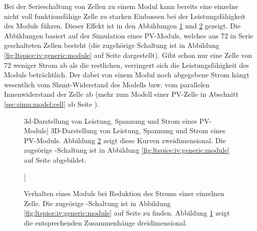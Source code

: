 Bei  der  Serieschaltung   von  Zellen  zu  einem  Modul   kann  bereits  eine
einzelne   nicht   voll   funktionsf\"ahige   Zelle   zu   starken   Einbussen
bei   der   Leistungsf\"ahigkeit  des   Moduls   f\"uhren\footnotemark. Dieser
Effekt  ist  in   den  Abbildungen  \ref{fig:simu:iv-curves:module:generic:3d}
und    \ref{fig:simu:iv-curves:module:generic}     gezeigt. Die    Abbildungen
basiert    auf   der    Simulation   eines    PV-Moduls,   welches    aus   72
in   Serie   geschalteten   Zellen   besteht   (die   zugeh\"orige   Schaltung
ist    in    Abbildung     \ref{fig:ltspice:iv:generic:module}    auf    Seite
\pageref{fig:ltspice:iv:generic:module}  dargestellt). Gibt   schon  nur  eine
Zelle  von  72 weniger  Strom  ab  als  die  restlichen, verringert  sich  die
Leistungsf\"ahigkeit des Moduls betr\"achtlich. Der dabei von einem Modul noch
abgegebene Strom h\"angt wesentlich vom  Shunt-Widerstand des Modells bzw. vom
parallelen Innenwiderstand  der Zelle  ab (mehr zum  Modell einer  PV-Zelle in
Abschnitt \ref{sec:simu:model:cell} ab Seite \pageref{sec:simu:model:cell}).


\begin{figure}[h!tb]
    \centering
    
    \caption
    [3d-Darstellung von Leistung, Spannung und Strom eines PV-Moduls]
    {%
        3D-Darstellung  von  Leistung,  Spannung und  Strom  eines  PV-Moduls.
        Abbildung    \ref{fig:simu:iv-curves:module:generic}    zeigt    diese
        Kurven  zweidimensional.    Die  zuge\"orige  -Schaltung
        ist   in  Abbildung   \ref{fig:ltspice:iv:generic:module}  auf   Seite
        \pageref{fig:ltspice:iv:generic:module} abgebildet.%
    }
    \label{fig:simu:iv-curves:module:generic:3d}
\end{figure}

\begin{figure}[h!tb]
    \centering
    
    \caption[IV- und PV-Kurven eines PV-Moduls bei Leistungseinbruch]{%
        Verhalten   eines    Moduls   bei    Reduktion   des    Stroms   einer
        einzelnen   Zelle.
        Die   zuge\"orige  -Schaltung   ist
        in    Abbildung    \ref{fig:ltspice:iv:generic:module}    auf    Seite
        \pageref{fig:ltspice:iv:generic:module}    zu    finden.     Abbildung
        \ref{fig:simu:iv-curves:module:generic:3d}  zeigt  die  entsprechenden
        Zusammenh\"ange dreidimensional.%
    }
    \label{fig:simu:iv-curves:module:generic}
\end{figure}

